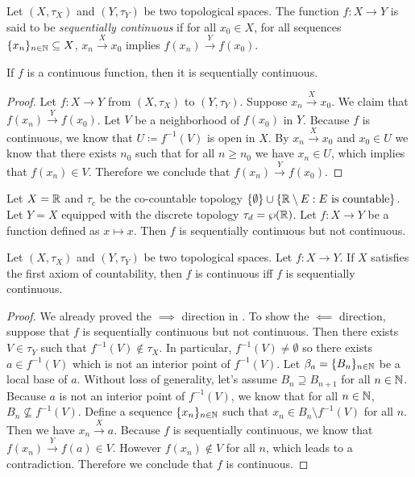 \documentclass{techreport}
\begin{document}
\begin{definition}\label{De:SequentiallyContinuous}
	Let $(X,\tau_X)$ and $(Y,\tau_Y)$ be two topological spaces.
	The function $f : X \to Y$ is said to be \emph{sequentially continuous} if for all $x_0 \in X$, for all sequences $\{x_n\}_{n \in \mathbb{N}} \subseteq X$, $x_n \xrightarrow{X} x_0$ implies $f(x_n) \xrightarrow{Y} f(x_0)$.
\end{definition}

\begin{proposition}\label{Prop:ContImplySeqCont}
	If $f$ is a continuous function, then it is sequentially continuous.
\end{proposition}
\begin{proof}
	Let $f : X \to Y$ from $(X,\tau_X)$ to $(Y,\tau_Y)$.
	Suppose $x_n \xrightarrow{X} x_0$.
	We claim that $f(x_n) \xrightarrow{Y} f(x_0)$.
	Let $V$ be a neighborhood of $f(x_0)$ in $Y$.
	Because $f$ is continuous, we know that $U \coloneqq f^{-1}(V)$ is open in $X$.
	By $x_n \xrightarrow{X} x_0$ and $x_0 \in U$ we know that there exists $n_0$ such that for all $n \ge n_0$ we have $x_n \in U$, which implies that $f(x_n) \in V$.
	Therefore we conclude that $f(x_n) \xrightarrow{Y} f(x_0)$.
\end{proof}

\begin{example}\label{Exa:SeqContNotCont}
	Let $X = \mathbb{R}$ and $\tau_c$ be the co-countable topology $\{ \emptyset \} \cup \{ \mathbb{R} \setminus E : E~\text{is countable} \}$.
	Let $Y = X$ equipped with the discrete topology $\tau_d = \wp(\mathbb{R})$.
	Let $f : X \to Y$ be a function defined as $x \mapsto x$.
	Then $f$ is sequentially continuous but not continuous.
\end{example}

\begin{proposition}\label{Prop:FstAxCountContIffSeqCont}
	Let $(X,\tau_X)$ and $(Y,\tau_Y)$ be two topological spaces.
	Let $f : X\to Y$.
	If $X$ satisfies the first axiom of countability, then $f$ is continuous iff $f$ is sequentially continuous.
\end{proposition}
\begin{proof}
	We already proved the ${\implies}$ direction in .
	To show the ${\impliedby}$ direction, suppose that $f$ is sequentially continuous but not continuous.
	Then there exists $V \in \tau_Y$ such that $f^{-1}(V) \not\in \tau_X$.
	In particular, $f^{-1}(V) \neq \emptyset$ so there exists $a \in f^{-1}(V)$ which is not an interior point of $f^{-1}(V)$.
	Let $\beta_a = \{B_n\}_{n\in \mathbb{N}}$ be a local base of $a$.
	Without loss of generality, let's assume $B_n \supseteq B_{n+1}$ for all $n \in \mathbb{N}$.
	Because $a$ is not an interior point of $f^{-1}(V)$, we know that for all $n \in \mathbb{N}$, $B_n \not\subseteq f^{-1}(V)$.
	Define a sequence $\{x_n\}_{n \in \mathbb{N}}$ such that $x_n \in B_n \setminus f^{-1}(V)$ for all $n$.
	Then we have $x_n \xrightarrow{X} a$.
	Because $f$ is sequentially continuous, we know that $f(x_n) \xrightarrow{Y} f(a) \in V$.
	However $f(x_n) \not\in V$ for all $n$, which leads to a contradiction.
	Therefore we conclude that $f$ is continuous.
\end{proof}
\end{document}
